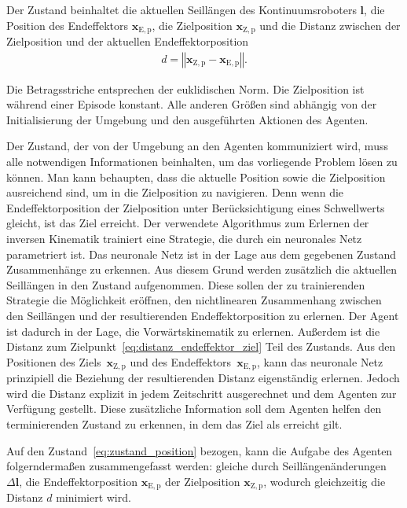 Der Zustand beinhaltet die aktuellen Seillängen des Kontinuumsroboters $\bm{l}$, die Position des Endeffektors $\bm{x}_{\mathrm{E,p}}$, die Zielposition $\bm{x}_{\mathrm{Z,p}}$ und die Distanz zwischen der Zielposition und der aktuellen Endeffektorposition
\begin{align}
d = \left\Vert \bm{x}_{\mathrm{Z,p}} - \bm{x}_{\mathrm{E,p}} \right\Vert .
\label{eq:distanz_endeffektor_ziel}
\end{align}

Die Betragsstriche entsprechen der euklidischen Norm.
Die Zielposition ist während einer Episode konstant. Alle anderen Größen sind abhängig von der Initialisierung der Umgebung und den ausgeführten Aktionen des Agenten.

Der Zustand, der von der Umgebung an den Agenten kommuniziert wird, muss alle notwendigen Informationen beinhalten, um das vorliegende Problem lösen zu können. Man kann behaupten, dass die aktuelle Position sowie die Zielposition ausreichend sind, um in die Zielposition zu navigieren. Denn wenn die Endeffektorposition der Zielposition unter Berücksichtigung eines Schwellwerts gleicht, ist das Ziel erreicht.
Der verwendete Algorithmus zum Erlernen der inversen Kinematik trainiert eine Strategie, die durch ein neuronales Netz parametriert ist. Das neuronale Netz ist in der Lage aus dem gegebenen Zustand Zusammenhänge zu erkennen. 
Aus diesem Grund werden zusätzlich die aktuellen Seillängen in den Zustand aufgenommen. Diese sollen der zu trainierenden Strategie die Möglichkeit eröffnen, den nichtlinearen Zusammenhang zwischen den Seillängen und der resultierenden Endeffektorposition zu erlernen. Der Agent ist dadurch in der Lage, die Vorwärtskinematik zu erlernen. 
Außerdem ist die Distanz zum Zielpunkt~\eqref{eq:distanz_endeffektor_ziel} Teil des Zustands. Aus den Positionen des Ziels~$\bm{x}_{\mathrm{Z,p}}$ und des Endeffektors~$\bm{x}_{\mathrm{E,p}}$, kann das neuronale Netz prinzipiell die Beziehung der resultierenden Distanz eigenständig erlernen. Jedoch wird die Distanz explizit in jedem Zeitschritt ausgerechnet und dem Agenten zur Verfügung gestellt. Diese zusätzliche Information soll dem Agenten helfen den terminierenden Zustand zu erkennen, in dem das Ziel als erreicht gilt.

Auf den Zustand~\eqref{eq:zustand_position} bezogen, kann die Aufgabe des Agenten folgerndermaßen zusammengefasst werden:
gleiche durch Seillängenänderungen $\Delta\bm{l}$, die Endeffektorposition $\bm{x}_{\mathrm{E,p}}$ der Zielposition $\bm{x}_{\mathrm{Z,p}}$, wodurch gleichzeitig die Distanz $d$ minimiert wird. \newline

